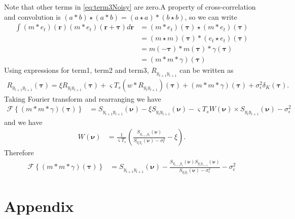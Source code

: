 \documentclass[]{article}
\begin{document}
Note that other terms in \ref{eq:term3Noisy} are zero.A property of cross-correlation and convolution is $(a \ast b) \star (a \ast b)=(a \star a)\ast(b \star b)$, so we can write
\begin{align}
 \int\left(m \ast e_t\right)(\mathbf r)\left(m \ast e_t\right)(\mathbf r+\boldsymbol\tau)d\mathbf r&=\left(m \ast e_t\right)(\boldsymbol\tau)\star\left(m \ast e_t\right)(\boldsymbol\tau) \nonumber \\
&=\left(m \star m\right)(\boldsymbol\tau)\ast\left(e_t \star e_t\right)(\boldsymbol\tau) \nonumber\\
&=m(-\boldsymbol\tau)\ast m(\boldsymbol\tau)\ast \gamma(\boldsymbol\tau) \nonumber \\
&=(m\ast m \ast \gamma)(\boldsymbol\tau)
\end{align}
Using expressions for term1, term2 and term3, $R_{y_{t+1}y_{t+1}}$ can be written as
\begin{align}
	R_{y_{t+1}y_{t+1}}(\boldsymbol{\tau})= \xi R_{y_ty_{t+1}}(\boldsymbol{\tau})+\varsigma T_s \left(w \ast R_{y_ty_{t+1}} \right)(\boldsymbol{\tau})+(m\ast m \ast \gamma)(\boldsymbol\tau)+\sigma_{\epsilon}^2\delta_K(\boldsymbol{\tau}).
\end{align}
Taking Fourier transform and rearranging we have
\begin{align}
 \mathcal F\left\lbrace (m\ast m \ast \gamma)(\boldsymbol\tau)\right\rbrace&= S_{y_{t+1}y_{t+1}}(\boldsymbol{\nu})-\xi S_{y_{t}y_{t+1}}(\boldsymbol{\nu})-\varsigma T_s W(\boldsymbol{\nu}) \times S_{y_ty_{t+1}}(\boldsymbol{\nu})-\sigma_{\epsilon}^2 
\end{align}
and we have
\begin{align}
 W(\boldsymbol{\nu}) &=\frac{1}{\varsigma T_s}\left(\frac{S_{y_{t+1}y_t}(\boldsymbol{\nu})}{S_{y_ty_t}(\boldsymbol{\nu})-\sigma_{\epsilon}^2}-\xi\right).
\end{align}
Therefore
\begin{align}
 \mathcal F\left\lbrace (m\ast m \ast \gamma)(\boldsymbol\tau)\right\rbrace&= S_{y_{t+1}y_{t+1}}(\boldsymbol{\nu})-\frac{S_{y_{t+1}y_t}(\boldsymbol{\nu})S_{y_{t}y_{t+1}}(\boldsymbol{\nu})}{S_{y_ty_t}(\boldsymbol{\nu})-\sigma_{\epsilon}^2}-\sigma_{\epsilon}^2
\end{align}

\section*{Appendix}
\end{document}
